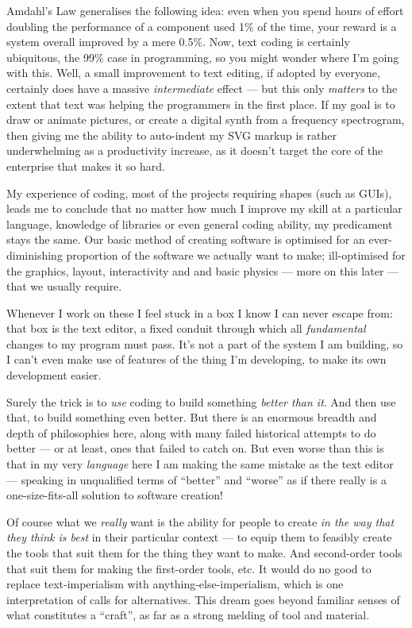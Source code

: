 \documentclass[english,submission]{programming}
\begin{document}
  Amdahl's Law generalises the following idea: even when you spend hours
  of effort doubling the performance of a component used 1\% of the time,
  your reward is a system overall improved by a mere 0.5\%. Now, text
  coding is certainly ubiquitous, the 99\% case in programming, so you
  might wonder where I'm going with this. Well, a small improvement to
  text editing, if adopted by everyone, certainly does have a massive
  \emph{intermediate} effect --- but this only \emph{matters} to the
  extent that text was helping the programmers in the first place. If my
  goal is to draw or animate pictures, or create a digital synth from a
  frequency spectrogram, then giving me the ability to auto-indent my SVG
  markup is rather underwhelming as a productivity increase, as it doesn't
  target the core of the enterprise that makes it so hard.

  My experience of coding, most of the projects requiring shapes (such as
  GUIs), leads me to conclude that no matter how much I improve my skill
  at a particular language, knowledge of libraries or even general coding
  ability, my predicament stays the same. Our basic method of creating
  software is optimised for an ever-diminishing proportion of the software
  we actually want to make; ill-optimised for the graphics, layout,
  interactivity and and basic physics --- more on this later --- that we
  usually require.

  Whenever I work on these I feel stuck in a box I know I can never escape
  from: that box is the text editor, a fixed conduit through which all
  \emph{fundamental} changes to my program must pass. It's not a part of
  the system I am building, so I can't even make use of features of the
  thing I'm developing, to make its own development easier.

  Surely the trick is to \emph{use} coding to build something \emph{better
  than it}. And then use that, to build something even better. But there
  is an enormous breadth and depth of philosophies here, along with many
  failed historical attempts to do better --- or at least, ones that
  failed to catch on. But even worse than this is that in my very
  \emph{language} here I am making the same mistake as the text editor ---
  speaking in unqualified terms of ``better'' and ``worse'' as if there
  really is a one-size-fits-all solution to software creation!

  Of course what we \emph{really} want is the ability for people to create
  \emph{in the way that they think is best} in their particular context
  --- to equip them to feasibly create the tools that suit them for the
  thing they want to make. And second-order tools that suit them for
  making the first-order tools, etc. It would do no good to replace
  text-imperialism with anything-else-imperialism, which is one
  interpretation of calls for alternatives. This dream goes beyond
  familiar senses of what constitutes a ``craft'', as far as a strong
  melding of tool and material.
\end{document}
